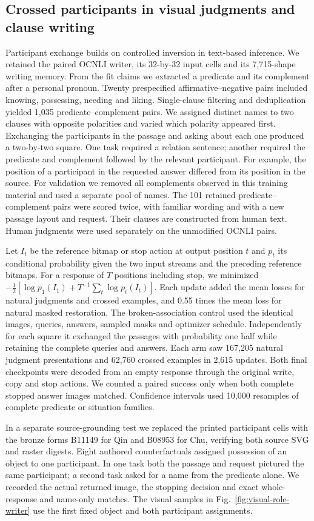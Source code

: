 \subsection*{Crossed participants in visual judgments and clause writing}
Participant exchange builds on controlled inversion in text-based inference\cite{rolemin}. We retained the paired OCNLI writer, its 32-by-32 input cells and its 7,715-shape writing memory. From the fit claims we extracted a predicate and its complement after a personal pronoun. Twenty prespecified affirmative--negative pairs included knowing, possessing, needing and liking. Single-clause filtering and deduplication yielded 1,035 predicate--complement pairs. We assigned distinct names to two clauses with opposite polarities and varied which polarity appeared first. Exchanging the participants in the passage and asking about each one produced a two-by-two square. One task required a relation sentence; another required the predicate and complement followed by the relevant participant. For example, the position of a participant in the requested answer differed from its position in the source. For validation we removed all complements observed in this training material and used a separate pool of names. The 101 retained predicate--complement pairs were scored twice, with familiar wording and with a new passage layout and request. Their clauses are constructed from human text. Human judgments were used separately on the unmodified OCNLI pairs.

Let $I_t$ be the reference bitmap or stop action at output position $t$ and $p_t$ its conditional probability given the two input streams and the preceding reference bitmaps. For a response of $T$ positions including stop, we minimized $-\tfrac12[\log p_1(I_1)+T^{-1}\sum_t\log p_t(I_t)]$. Each update added the mean losses for natural judgments and crossed examples, and 0.55 times the mean loss for natural masked restoration. The broken-association control used the identical images, queries, answers, sampled masks and optimizer schedule. Independently for each square it exchanged the passages with probability one half while retaining the complete queries and answers. Each arm saw 167,205 natural judgment presentations and 62,760 crossed examples in 2,615 updates. Both final checkpoints were decoded from an empty response through the original write, copy and stop actions. We counted a paired success only when both complete stopped answer images matched. Confidence intervals used 10,000 resamples of complete predicate or situation families.

In a separate source-grounding test we replaced the printed participant cells with the bronze forms B11149 for Qin and B08953 for Chu, verifying both source SVG and raster digests. Eight authored counterfactuals assigned possession of an object to one participant. In one task both the passage and request pictured the same participant; a second task asked for a name from the predicate alone. We recorded the actual returned image, the stopping decision and exact whole-response and name-only matches. The visual samples in Fig.~\ref{fig:visual-role-writer} use the first fixed object and both participant assignments.

